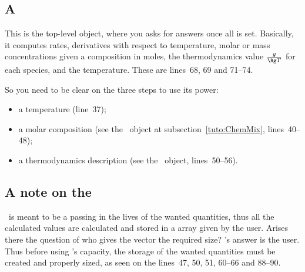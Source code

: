 \subsection{A \KineticsEvaluator}
\label{tuto:KineticsEval}

This is the top-level object, where you asks for
answers once all is set. Basically, it computes
rates, derivatives with respect to temperature,
molar or mass concentrations given a composition in
moles, the thermodynamics value $\frac{\gibbs}{\Rg\Temp}$
for each species, and the temperature.
These are lines~68, 69 and 71--74.

So you need to be clear on the three steps to use its power:
\begin{itemize}
\item a temperature (line~37);
\item a molar composition (see the \ChemicalMixture\ object
        at subsection~\ref{tuto:ChemMix}, lines~40--48);
\item a thermodynamics description (see the \CEAThermodynamics\
        object, lines~50--56).
\end{itemize}

\subsection{A note on the }

\Antioch\ is meant to be a passing in the lives of
the wanted quantities, thus all the calculated values
are calculated and stored in a array given by the
user. Arises there the question of who gives the vector
the required size? \Antioch's answer is the user. Thus
before using \Antioch's capacity, the storage of the
wanted quantities must be created and properly sized,
as seen on the lines~47, 50, 51, 60--66 and 88--90.
